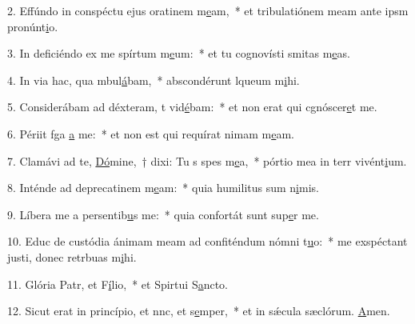 2. Effúndo in conspéctu ejus oratinem m\uline{e}am,~* et tribulatiónem meam ante ipsm pronúnt\uline{i}o.\par 
3. In deficiéndo ex me spírtum m\uline{e}um:~* et tu cognovísti smitas m\uline{e}as.\par 
4. In via hac, qua mbul\uline{á}bam,~* abscondérunt lqueum m\uline{i}hi.\par 
5. Considerábam ad déxteram, t vid\uline{é}bam:~* et non erat qui cgnóscer\uline{e}t me.\par 
6. Périit fga \uline{a} me:~* et non est qui requírat nimam m\uline{e}am.\par 
7. Clamávi ad te, \uline{Dó}mine,~† dixi: Tu s spes m\uline{e}a,~* pórtio mea in terr vivént\uline{i}um.\par 
8. Inténde ad deprecatinem m\uline{e}am:~* quia humilitus sum n\uline{i}mis.\par 
9. Líbera me a persentib\uline{u}s me:~* quia confortát sunt sup\uline{e}r me.\par 
10. Educ de custódia ánimam meam ad confiténdum nómni t\uline{u}o:~* me exspéctant justi, donec retrbuas m\uline{i}hi.\par 
11. Glória Patr, et F\uline{í}lio,~* et Spirtui S\uline{a}ncto.\par 
12. Sicut erat in princípio, et nnc, et s\uline{e}mper,~* et in sǽcula sæclórum. \uline{A}men.\par 
